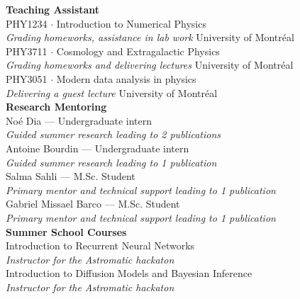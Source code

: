 \textbf{Teaching Assistant}\\[-0.1em]
PHY1234 $\cdot$ Introduction to Numerical Physics \hfill {}\\[-0.25em]
\emph{Grading homeworks, assistance in lab work} \hfill University of Montréal\\[0.25em]
PHY3711 $\cdot$ Cosmology and Extragalactic Physics \hfill {}\\[-0.25em]
\emph{Grading homeworks and delivering lectures} \hfill University of Montréal\\[0.5em]
PHY3051 $\cdot$ Modern data analysis in physics \hfill {}\\[-0.25em]
\emph{Delivering a guest lecture} \hfill University of Montréal\\[0.5em]
\textbf{Research Mentoring}\\[-0.1em]
Noé Dia — Undergraduate intern \hfill {}\\[-0.25em]
\emph{Guided summer research leading to 2 publications}\\[0.25em]
Antoine Bourdin — Undergraduate intern \hfill {}\\[-0.25em]
\emph{Guided summer research leading to 1 publication}\\[0.5em]
Salma Sahli — M.Sc. Student \hfill {}\\[-0.25em]
\emph{Primary mentor and technical support leading to 1 publication}\\[0.25em]
Gabriel Missael Barco — M.Sc. Student \hfill {}\\[-0.25em]
\emph{Primary mentor and technical support leading to 1 publication}\\[0.5em]
\textbf{Summer School Courses}\\[-0.1em]
Introduction to Recurrent Neural Networks \hfill {}\\[-0.25em]
\emph{Instructor for the Astromatic hackaton}\\[0.25em]
Introduction to Diffusion Models and Bayesian Inference \hfill {}\\[-0.25em]
\emph{Instructor for the Astromatic hackaton}
